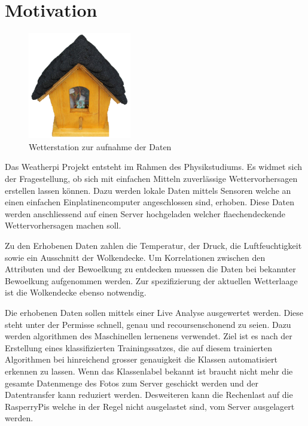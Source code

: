 \section{Motivation}
\label{sec:Motivation}

\begin{figure}
		\centering
		\includegraphics[width=0.4\textwidth]{./pictures/wetterstation.pdf}
		\caption{Wetterstation zur aufnahme der Daten}
		\label{fig:name}
\end{figure}
Das Weatherpi Projekt entsteht im Rahmen des Physikstudiums.
Es widmet sich der Fragestellung, ob sich mit einfachen Mitteln zuverlässige
Wettervorhersagen erstellen lassen können.
Dazu werden lokale Daten mittels Sensoren welche an einen einfachen Einplatinencomputer
angeschlossen sind, erhoben.
Diese Daten werden anschliessend auf einen Server hochgeladen welcher
flaechendeckende Wettervorhersagen machen soll. \par
Zu den Erhobenen Daten zahlen die Temperatur, der Druck, die Luftfeuchtigkeit
sowie ein Ausschnitt der Wolkendecke.
Um Korrelationen zwischen den Attributen und der Bewoelkung zu entdecken muessen die Daten
bei bekannter Bewoelkung aufgenommen werden.
Zur spezifizierung der aktuellen Wetterlaage ist die Wolkendecke ebenso notwendig.

Die erhobenen Daten sollen mittels einer Live Analyse ausgewertet werden.
Diese steht unter der Permisse schnell, genau und recoursenschonend zu seien.
Dazu werden algorithmen des Maschinellen lernenens verwendet. 
Ziel ist es nach der Erstellung eines klassifizierten Trainingssatzes, die auf
diesem trainierten Algorithmen bei hinreichend grosser genauigkeit die Klassen
automatisiert erkennen zu lassen.
Wenn das Klassenlabel bekannt ist braucht nicht mehr die gesamte Datenmenge des Fotos 
zum Server geschickt werden und der Datentransfer kann reduziert werden. 
Desweiteren kann die Rechenlast auf die RasperryPis welche in der Regel nicht ausgelastet sind, 
vom Server ausgelagert werden. 

